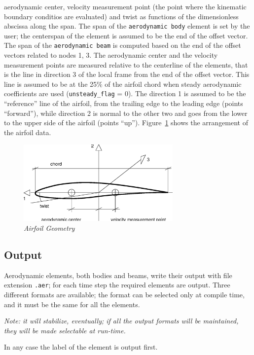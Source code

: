 aerodynamic center, velocity measurement point (the point where the
kinematic boundary conditios are evaluated) and twist as functions 
of the dimensionless abscissa along the span.
The span of the \texttt{aerodynamic body} element is set by the user; the
centerspan of the element is assumed to be the end of the offset vector.
The span of the \texttt{aerodynamic beam} is computed based on the end of the
offset vectors related to nodes 1, 3.
The aerodynamic center and the velocity measurement points are measured
relative to the centerline of the elements, that is the line in direction 3
of the local frame from the end of the offset vector.
This line is assumed to be at the 25\% of the airfoil chord when steady
aerodynamic coefficients are used (\texttt{unsteady\_flag} = 0).
The direction 1 is assumed to be the ``reference'' line of the airfoil, 
from the trailing edge to the leading edge (points ``forward''),
while direction 2 is normal to the other two and goes from the lower 
to the upper side of the airfoil (points ``up''). 
Figure~\ref{fig:AIRFOIL} shows the arrangement of the airfoil data.

\begin{figure}[h]
  \centering
    \includegraphics[width=80mm]{airfoil.eps}
  \caption{\em Airfoil Geometry}\label{fig:AIRFOIL}
\end{figure}


\subsection{Output}
Aerodynamic elements, both bodies and beams, write their output with file
extension \texttt{.aer}; for each time step the required elements are output.
Three different formats are available; the format can be selected only at
compile time, and it must be the same for all the elements. 

\noindent
{\em Note: it will stabilize, eventually; if all the output formats will be
maintained, they will be made selectable at run-time.}

\noindent
In any case the label of the element is output first.


